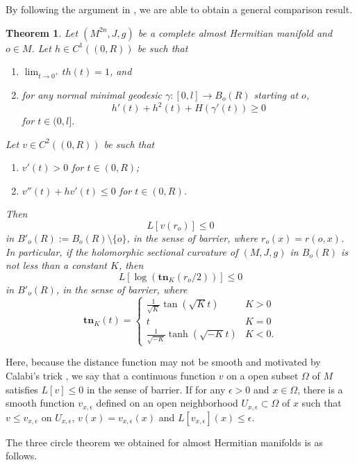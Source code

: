 \documentclass[12pt]{amsart}
\def\e{\epsilon}
\newtheorem{thm}{Theorem}[section]
\theoremstyle{definition}
\theoremstyle{remark}
\numberwithin{equation}{section}
\def\tn{{\mathbf{tn}}}
\def\D{\displaystyle}
\begin{document}
By following the argument in \cite{Yu2}, we are able to obtain a general comparison result.
\begin{thm}\label{thm-comparison}
Let $(M^{2n},J,g)$ be a complete almost Hermitian manifold  and $o\in M$. Let $h\in C^1((0,R))$ be such that
\begin{enumerate}
\item $\D\lim_{t\to 0^+}th(t)=1$, and
\item for any normal minimal geodesic $\gamma:[0,l]\to B_o(R)$ starting at $o$,
\begin{equation}\label{eq-Riccati-h}
h'(t)+h^2(t)+H(\gamma'(t))\geq 0
\end{equation}
for $t\in (0,l]$.
\end{enumerate}
 Let $v\in C^2((0,R))$ be such that
\begin{enumerate}
\item $v'(t)>0$ for $t\in (0,R)$;
\item $v''(t)+hv'(t)\leq 0$ for $t\in (0,R)$.
\end{enumerate}
Then
$$L[v(r_o)]\leq 0$$
in $B'_o(R):=B_o(R)\setminus\{o\}$, in the sense of barrier, where $r_o(x)=r(o,x)$. In particular, if the holomorphic sectional curvature of $(M,J,g)$ in $B_o(R)$ is not less than a constant $K$, then
\begin{equation}\label{eq-comparison-K}
L[\log(\tn_K(r_o/2))]\leq 0
\end{equation}
in $B'_o(R)$, in the sense of barrier, where
\begin{equation}
\tn_K(t)=\left\{\begin{array}{cl}\frac{1}{\sqrt K}\tan(\sqrt Kt)&K>0\\
t&K=0\\
\frac{1}{\sqrt{-K}}\tanh(\sqrt{-K}t)&K<0.
\end{array}\right.
\end{equation}
\end{thm}
Here, because the distance function may not be smooth and motivated by Calabi's trick \cite{Ca}, we say that a continuous function $v$ on a open subset $\Omega$ of $M$ satisfies
$L[v]\leq 0$
in the sense of barrier. If for any $\e>0$ and $x\in \Omega$, there is a smooth function $v_{x,\e}$ defined on an open neighborhood $U_{x,\e}\subset \Omega$ of $x$ such that $v\leq v_{x,\e}$ on $U_{x,\e}$, $v(x)=v_{x,\e}(x)$ and $L[v_{x,\e}](x)\leq \e$.

The three circle theorem we obtained for almost Hermitian manifolds is as follows.
\end{document}
